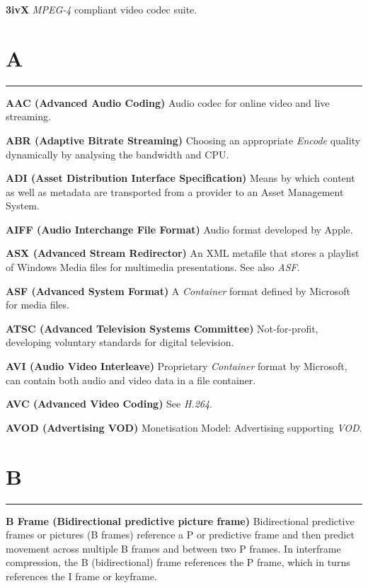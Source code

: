 
\textbf{3ivX}
\textit{MPEG-4} compliant video codec suite.

\section{A}
\hrule

\medskip
\textbf{AAC (Advanced Audio Coding)}
Audio codec for online video and live streaming.

\smallskip
\textbf{ABR (Adaptive Bitrate Streaming)}
Choosing an appropriate \textit{Encode} quality dynamically by analysing the bandwidth and CPU.

\smallskip
\textbf{ADI (Asset Distribution Interface Specification)}
Means by which content as well as metadata are transported from a provider to an Asset Management System.

\smallskip
\textbf{AIFF (Audio Interchange File Format)}
Audio format developed by Apple.

\smallskip
\textbf{ASX (Advanced Stream Redirector)}
An XML metafile that stores a playlist of Windows Media files for multimedia presentations. See also \textit{ASF}.

\smallskip
\textbf{ASF (Advanced System Format)}
A \textit{Container} format defined by Microsoft for media files.

\smallskip
\textbf{ATSC (Advanced Television Systems Committee)}
Not-for-profit, developing voluntary standards for digital television.

\smallskip
\textbf{AVI (Audio Video Interleave)}
Proprietary \textit{Container} format by Microsoft, can contain both audio and video data in a file container.

\smallskip
\textbf{AVC (Advanced Video Coding)}
See \textit{H.264}.

\smallskip
\textbf{AVOD (Advertising VOD)}
Monetisation Model: Advertising supporting \textit{VOD}.


\section{B}
\hrule

\medskip
\textbf{B Frame (Bidirectional predictive picture frame)}
Bidirectional predictive frames or pictures (B frames) reference a P or predictive frame and then predict movement across multiple B frames and between two P frames. In interframe compression, the B (bidirectional) frame references the P frame, which in turns references the I frame or keyframe.



